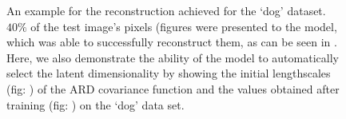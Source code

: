 \begin{figure}[ht]
\begin{center}
\end{center}
\caption{\small{
 An example for the reconstruction achieved for the `dog' dataset. $40\%$ of the test image's pixels (figures   were presented  to the model, which was able to successfully reconstruct them, as can be seen in .     
Here, we also demonstrate the ability of the model to automatically select the latent dimensionality by showing the initial lengthscales (fig: ) of the ARD covariance function and the values obtained after training (fig: ) on the `dog' data set.
}
}
\label{fig:dogRec}
\end{figure}


